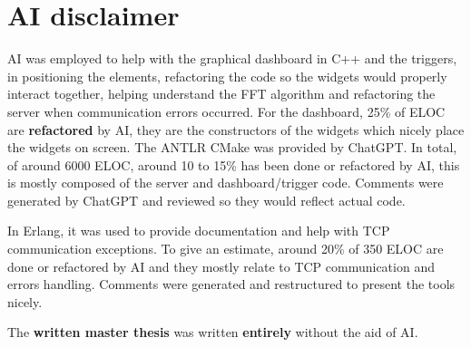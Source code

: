 \chapter*{AI disclaimer}
    AI was employed to help with the graphical dashboard in C++ and the triggers, in positioning the elements, refactoring the code so the widgets would properly interact together, helping understand the FFT algorithm and refactoring the server when communication errors occurred. For the dashboard, 25\% of ELOC are \textbf{refactored} by AI, they are the constructors of the widgets which nicely place the widgets on screen. The ANTLR CMake was provided by ChatGPT. In total, of around 6000 ELOC, around 10 to 15\% has been done or refactored by AI, this is mostly composed of the server and dashboard/trigger code. Comments were generated by ChatGPT and reviewed so they would reflect actual code.
    
    In Erlang, it was used to provide documentation and help with TCP communication exceptions. To give an estimate, around 20\% of 350 ELOC are done or refactored by AI and they mostly relate to TCP communication and errors handling. Comments were generated and restructured to present the tools nicely.

    The \textbf{written master thesis} was written \textbf{entirely} without the aid of AI.
